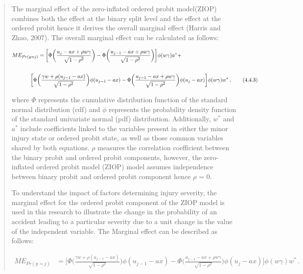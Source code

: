 \documentclass[12]{report}
\begin{document}
\begin{quote}
{The marginal effect of the zero-inflated ordered probit model(ZIOP) combines both the effect at the binary split level and the effect at the ordered probit hence it derives the overall marginal effect (Harris and Zhao, 2007). The overall marginal effect can be calculated as follows:
\begin{fleqn}
\begin{align*}
 ME_{Pr(y = j)} &= \biggl[ \Phi \biggl( \frac{u_{j} - ax + \rho w \gamma}{\sqrt{1 - \rho^2}} \biggr) 
 - \Phi \biggl( \frac{u_{j-1} - ax + \rho w \gamma}{\sqrt{1 - \rho^2}} \biggr) \biggr] \phi(w \gamma) a^* +\\
 \\
 & \hspace{-1.5em} \biggl[ \Phi \biggl(\frac{ \gamma w + \rho (u_{j-1} - ax) }{\sqrt{1 - \rho^2}} \biggr) 
 \phi(u_{j-1} - ax) 
 - \Phi \biggl( \frac{u_{j-1} - ax + \rho w \gamma}{\sqrt{1 - \rho^2}} \biggr) 
 \phi(u_{j} - ax) \biggr] \phi(w \gamma) w^*  \, ,
 \tag{4.4.3}
\end{align*}
\end{fleqn}

where $\Phi$ represents the cumulative distribution function of the standard normal distribution (cdf) and $\phi$ represents the probability density function of the standard univariate normal (pdf) distribution. Additionally, $w^*$ and $a^*$ include coefficients linked to the variables present in either the minor injury state or ordered probit state, as well as those common variables shared by both equations. $\rho$ measures the correlation coefficient between the binary probit and ordered probit components, however, the zero-inflated ordered probit model (ZIOP) model assumes independence between binary probit and ordered probit component hence $\rho$ = 0.

To understand the impact of factors determining injury severity, the marginal effect for the ordered probit component of the ZIOP model is used in this research to illustrate the change in the probability of an accident leading to a particular severity due to a unit change in the value of the independent variable. The Marginal effect can be described as follows:
\begin{fleqn}
\begin{align*}
ME_{Pr(y = j)} &= \biggl[ \Phi \biggl(\frac{ \gamma w + \rho (u_{j-1} - ax) }{\sqrt{1 - \rho^2}} \biggr) 
 \phi(u_{j-1} - ax) 
 - \Phi \biggl( \frac{u_{j-1} - ax + \rho w \gamma}{\sqrt{1 - \rho^2}} \biggr) 
 \phi(u_{j} - ax) \biggr] \phi(w \gamma) w^* \, .
  \tag{4.4.4}
\end{align*}
\end{fleqn}

}
\end{quote}
\end{document}
